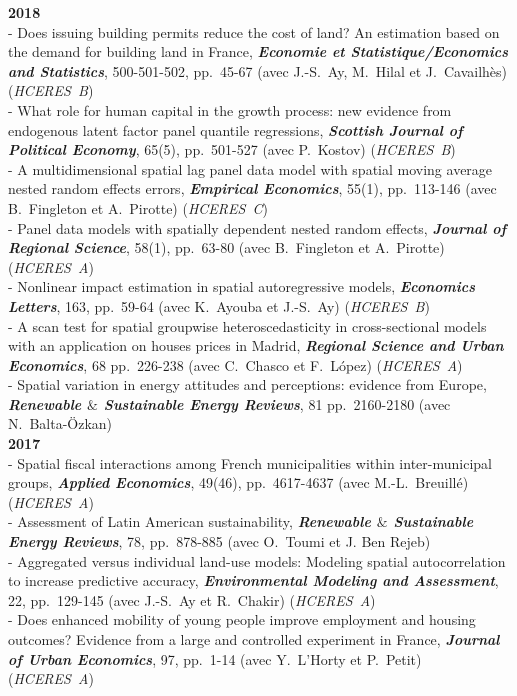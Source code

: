 \documentclass[a4paper,12pt]{article}
\begin{document}
\noindent \textbf{2018}  \smallskip \\ 
- Does issuing building permits reduce the cost of land? An estimation based on the demand for building land in France, \textit{\textbf{Economie et Statistique/Economics and Statistics}}, 500-501-502, pp.~45-67 (avec J.-S.~Ay, M.~Hilal et J.~Cavailhès)(\textit{HCERES~B}) \\
- What role for human capital in the growth process: new evidence from endogenous latent factor panel quantile regressions, \textit{\textbf{Scottish Journal of Political Economy}}, 65(5), pp.~501-527 (avec P.~Kostov) (\textit{HCERES~B}) \\
- A multidimensional spatial lag panel data model with spatial moving average nested random effects errors, \textit{\textbf{Empirical Economics}}, 55(1), pp.~113-146 (avec B.~Fingleton et A.~Pirotte) (\textit{HCERES~C}) \\
- Panel data models with spatially dependent nested random effects, \textit{\textbf{Journal of Regional Science}}, 58(1), pp.~63-80 (avec B.~Fingleton et A.~Pirotte) (\textit{HCERES~A}) \\
- Nonlinear impact estimation in spatial autoregressive models, \textit{\textbf{Economics Letters}}, 163, pp.~59-64 (avec K.~Ayouba et J.-S.~Ay) (\textit{HCERES~B}) \\
- A scan test for spatial groupwise heteroscedasticity in cross-sectional models with an application on houses prices in Madrid, \textit{\textbf{Regional Science and Urban Economics}}, 68 pp.~226-238 (avec C.~Chasco et F.~López) (\textit{HCERES~A}) \\
- Spatial variation in energy attitudes and perceptions: evidence from Europe, \textit{\textbf{Renewable $\&$ Sustainable Energy Reviews}}, 81 pp.~2160-2180 (avec N.~Balta-Özkan) \\
		
\noindent \textbf{2017}  \smallskip \\ 
- Spatial fiscal interactions among French municipalities within inter-municipal groups, \textit{\textbf{Applied Economics}}, 49(46), pp.~4617-4637 (avec M.-L.~Breuillé) (\textit{HCERES~A}) \\
- Assessment of Latin American sustainability, \textit{\textbf{Renewable $\&$ Sustainable Energy Reviews}}, 78, pp.~878-885 (avec O.~Toumi et J. Ben Rejeb) \\
- Aggregated versus individual land-use models: Modeling spatial autocorrelation to increase predictive accuracy, \textit{\textbf{Environmental Modeling and Assessment}}, 22, pp.~129-145 (avec J.-S.~Ay et R.~Chakir) (\textit{HCERES~A}) \\
- Does enhanced mobility of young people improve employment and housing outcomes? Evidence from a large and controlled experiment in France, \textit{\textbf{Journal of Urban Economics}}, 97, pp.~1-14 (avec Y.~L'Horty et P.~Petit) (\textit{HCERES~A}) \\
		
\end{document}
